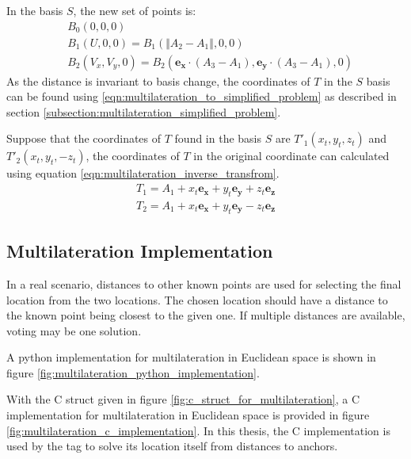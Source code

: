 \documentclass[\main/main.tex]{subfiles}
\begin{document}
In the basis $S$, the new set of points is:
\begin{equation}
    \begin{split}
        &B_0(0,0,0) \\
        &B_1(U, 0, 0) = B_1(\Vert A_2 - A_1 \Vert, 0, 0) \\
        &B_2(V_x, V_y, 0) = B_2(\boldsymbol{e_x} \cdot (A_3 - A_1), \boldsymbol{e_y} \cdot (A_3 - A_1), 0) 
    \end{split}
    \label{eqn:multilateration_to_simplified_problem}
\end{equation}
As the distance is invariant to basis change, the coordinates of $T$ in the $S$ basis can be found using \ref{eqn:multilateration_to_simplified_problem} as described in section \ref{subsection:multilateration_simplified_problem}.

Suppose that the coordinates of $T$ found in the basis $S$ are $T'_1(x_t,y_t,z_t)$ and $T'_2(x_t, y_t, -z_t)$, the coordinates of $T$ in the original coordinate can calculated using equation \ref{eqn:multilateration_inverse_transfrom}.
\begin{equation}
    \begin{split}
        T_1 = A_1 + x_t\boldsymbol{e_x} + y_t\boldsymbol{e_y} + z_t\boldsymbol{e_z} \\
        T_2 = A_1 + x_t\boldsymbol{e_x} + y_t\boldsymbol{e_y} - z_t\boldsymbol{e_z} 
    \end{split}
    \label{eqn:multilateration_inverse_transfrom}
\end{equation}

\subsection{Multilateration Implementation}

In a real scenario, distances to other known points are used for selecting the final location from the two locations. The chosen location should have a distance to the known point being closest to the given one. If multiple distances are available, voting may be one solution.

A python implementation for multilateration in Euclidean space is shown in figure \ref{fig:multilateration_python_implementation}.

With the C struct given in figure \ref{fig:c_struct_for_multilateration}, a C implementation for multilateration in Euclidean space is provided in figure \ref{fig:multilateration_c_implementation}. In this thesis, the C implementation is used by the tag to solve its location itself from distances to anchors.
\end{document}

